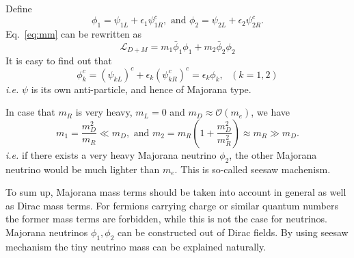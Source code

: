 Define
\begin{equation}
  \label{eq:mafi}
  \phi_{1} = \psi_{1L} + \epsilon_{1}\psi^{c}_{1R}, 
  \mbox{\ \ \ and \ \ \ }
  \phi_{2} = \psi_{2L} + \epsilon_{2}\psi^{c}_{2R}.
\end{equation}
Eq.~\ref{eq:mm} can be rewritten as
\begin{equation}
  \label{eq:mv}
  \mathcal{L}_{D+M} = m_{1}\bar{\phi}_{1}\phi_{1} +
m_{2}\bar{\phi}_{2}\phi_{2}
\end{equation}
It is easy to find out that
\begin{equation}
  \label{eq:mach}
  \phi^{c}_{k} = (\psi_{kL})^{c} + \epsilon_{k}(\psi^{c}_{kR})^{c} =
\epsilon_{k}\phi_{k}, ~~~ (k=1,2)
\end{equation}
\textit{i.e.} $\psi$ is its own anti-particle, and hence of Majorana
type.

In case that $m_{R}$ is very heavy, $m_{L} = 0$ and $m_{D} \approx
\mathcal{O}(m_{e})$, we have
\begin{equation}
  \label{eq:seesaw}
  m_{1} = \frac{m^{2}_{D}}{m_{R}}\ll m_{D},  \mbox{\ \ \ and \ \ \ }  
m_{2} = m_{R}(1+\frac{m^{2}_{D}}{m^{2}_{R}}) \approx m_{R} \gg m_{D}.
\end{equation}
\textit{i.e.} if there exists a very heavy Majorana neutrino $\phi_2$,
the other Majorana neutrino would be much lighter than $m_e$. This is
so-called seesaw machenism.

To sum up, Majorana mass terms should be taken into account in general
as well as Dirac mass terms. For fermions carrying charge or similar
quantum numbers the former mass terms are forbidden, while this is not
the case for neutrinos. Majorana neutrinos $\phi_{1}, \phi_{2}$ can be
constructed out of Dirac fields. By using seesaw mechanism the tiny
neutrino mass can be explained naturally.

